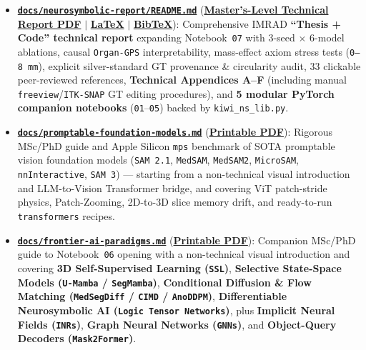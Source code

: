 \documentclass[10pt,a4paper]{article}
\newcommand{\ghblob}{https://github.com/arvidl/BMED365-2027/blob/main}
\begin{document}
\begin{infobox}
\begin{itemize}
    \item \href{\ghblob/Lab4-Comp-Imag/Kiwi-challenge/docs/neurosymbolic-report/README.md}{\textbf{\texttt{docs/neurosymbolic-report/README.md}}} (\href{\ghblob/Lab4-Comp-Imag/Kiwi-challenge/docs/neurosymbolic-report/neurosymbolic-kiwi-report.pdf}{\textbf{Master's-Level Technical Report PDF}} $|$ \href{\ghblob/Lab4-Comp-Imag/Kiwi-challenge/docs/neurosymbolic-report/neurosymbolic-kiwi-report.tex}{\textbf{\LaTeX}} $|$ \href{\ghblob/Lab4-Comp-Imag/Kiwi-challenge/docs/neurosymbolic-report/references.bib}{\textbf{BibTeX}}): Comprehensive IMRAD \textbf{``Thesis + Code'' technical report} expanding Notebook~\texttt{07} with 3-seed $\times$ 6-model ablations, causal \texttt{Organ-GPS} interpretability, mass-effect axiom stress tests (\texttt{0--8\,mm}), explicit silver-standard GT provenance \& circularity audit, 33 clickable peer-reviewed references, \textbf{Technical Appendices A--F} (including manual \texttt{freeview}/\texttt{ITK-SNAP} GT editing procedures), and \textbf{5 modular PyTorch companion notebooks} (\texttt{01}--\texttt{05}) backed by \texttt{kiwi\_ns\_lib.py}.
    \item \href{\ghblob/Lab4-Comp-Imag/Kiwi-challenge/docs/promptable-foundation-models.md}{\textbf{\texttt{docs/promptable-foundation-models.md}}} (\href{\ghblob/Lab4-Comp-Imag/Kiwi-challenge/docs/promptable-foundation-models.pdf}{\textbf{Printable PDF}}): Rigorous MSc/PhD guide and Apple Silicon \texttt{mps} benchmark of SOTA promptable vision foundation models (\texttt{SAM 2.1}, \texttt{MedSAM}, \texttt{MedSAM2}, \texttt{MicroSAM}, \texttt{nnInteractive}, \texttt{SAM 3}) --- starting from a non-technical visual introduction and LLM-to-Vision Transformer bridge, and covering ViT patch-stride physics, Patch-Zooming, 2D-to-3D slice memory drift, and ready-to-run \texttt{transformers} recipes.
    \item \href{\ghblob/Lab4-Comp-Imag/Kiwi-challenge/docs/frontier-ai-paradigms.md}{\textbf{\texttt{docs/frontier-ai-paradigms.md}}} (\href{\ghblob/Lab4-Comp-Imag/Kiwi-challenge/docs/frontier-ai-paradigms.pdf}{\textbf{Printable PDF}}): Companion MSc/PhD guide to Notebook~\texttt{06} opening with a non-technical visual introduction and covering \textbf{3D Self-Supervised Learning (\texttt{SSL})}, \textbf{Selective State-Space Models (\texttt{U-Mamba} / \texttt{SegMamba})}, \textbf{Conditional Diffusion \& Flow Matching (\texttt{MedSegDiff} / \texttt{CIMD} / \texttt{AnoDDPM})}, \textbf{Differentiable Neurosymbolic AI (\texttt{Logic Tensor Networks})}, plus \textbf{Implicit Neural Fields (\texttt{INRs})}, \textbf{Graph Neural Networks (\texttt{GNNs})}, and \textbf{Object-Query Decoders (\texttt{Mask2Former})}.
\end{itemize}
\end{infobox}
\end{document}
